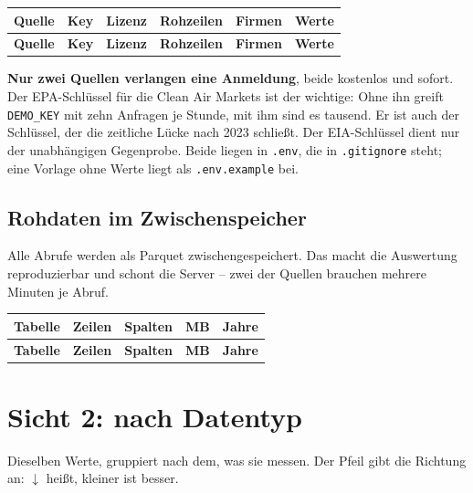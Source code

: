 \documentclass[11pt,a4paper]{article}
\newcommand{\befund}[1]{%
  \par\vspace{2pt}\noindent\colorbox{softgrey}{%
  \begin{minipage}{\dimexpr\linewidth-2\fboxsep}\small\vspace{3pt}#1\vspace{3pt}\end{minipage}}\par\vspace{4pt}}
\begin{document}
\begin{center}\footnotesize
\begin{longtable}{P{5.4cm} c P{2.9cm} r r r}
\toprule
\textbf{Quelle} & \textbf{Key} & \textbf{Lizenz} & \textbf{Rohzeilen} & \textbf{Firmen} & \textbf{Werte} \\
\midrule
\endfirsthead
\toprule
\textbf{Quelle} & \textbf{Key} & \textbf{Lizenz} & \textbf{Rohzeilen} & \textbf{Firmen} & \textbf{Werte} \\
\midrule
\endhead

\end{longtable}
\end{center}

\befund{\textbf{Nur zwei Quellen verlangen eine Anmeldung}, beide kostenlos und sofort. Der EPA-Schlüssel für die Clean Air Markets ist der wichtige: Ohne ihn greift \texttt{DEMO\_KEY} mit zehn Anfragen je Stunde, mit ihm sind es tausend. Er ist auch der Schlüssel, der die zeitliche Lücke nach 2023 schließt. Der EIA-Schlüssel dient nur der unabhängigen Gegenprobe. Beide liegen in \texttt{.env}, die in \texttt{.gitignore} steht; eine Vorlage ohne Werte liegt als \texttt{.env.example} bei.}

\subsection{Rohdaten im Zwischenspeicher}

Alle Abrufe werden als Parquet zwischengespeichert. Das macht die Auswertung reproduzierbar und schont die Server -- zwei der Quellen brauchen mehrere Minuten je Abruf.

\begin{center}\footnotesize
\begin{longtable}{P{7.2cm} r r r c}
\toprule
\textbf{Tabelle} & \textbf{Zeilen} & \textbf{Spalten} & \textbf{MB} & \textbf{Jahre} \\
\midrule
\endfirsthead
\toprule
\textbf{Tabelle} & \textbf{Zeilen} & \textbf{Spalten} & \textbf{MB} & \textbf{Jahre} \\
\midrule
\endhead

\end{longtable}
\end{center}

\newpage
\section{Sicht 2: nach Datentyp}

Dieselben Werte, gruppiert nach dem, was sie messen. Der Pfeil gibt die Richtung an: $\downarrow$ heißt, kleiner ist besser.
\end{document}
